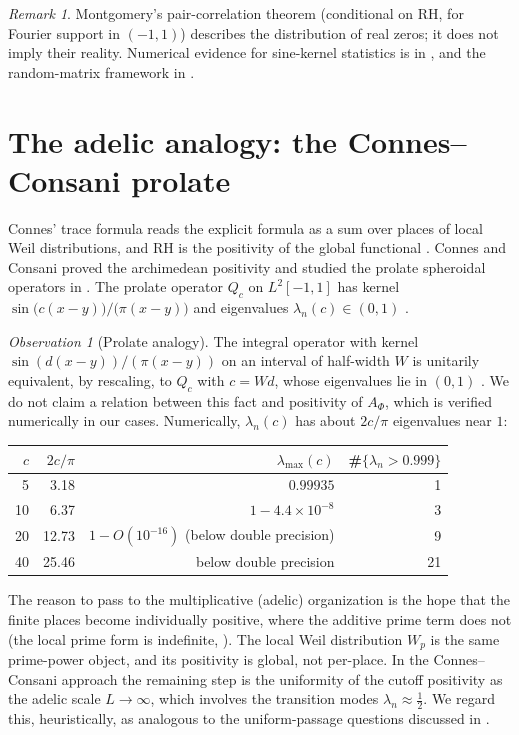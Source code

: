 \documentclass[11pt]{amsart}
\theoremstyle{definition}
\theoremstyle{remark}
\newtheorem{remark}[theorem]{Remark}
\newtheorem{observation}[theorem]{Observation}
\newcommand{\Aphi}{A_\Phi}
\begin{document}
\begin{remark}
Montgomery's pair-correlation theorem \cite{Montgomery} (conditional on RH, for Fourier support in $(-1,1)$)
describes the distribution of real zeros; it does not imply their reality. Numerical evidence for sine-kernel
statistics is in \cite{Odlyzko}, and the random-matrix framework in \cite{RudnickSarnak}.
\end{remark}

\section{The adelic analogy: the Connes--Consani prolate}\label{sec:connes}

Connes' trace formula reads the explicit formula as a sum over places of local Weil distributions, and RH is
the positivity of the global functional \cite{Connes1999}. Connes and Consani proved the archimedean positivity
\cite{CC2021} and studied the prolate spheroidal operators in \cite{CCprolate}. The prolate operator $Q_c$ on
$L^2[-1,1]$ has kernel $\sin\!\big(c(x-y)\big)/\big(\pi(x-y)\big)$ and eigenvalues $\lambda_n(c)\in(0,1)$
\cite{SlepianPollak}.

\begin{observation}[Prolate analogy]\label{obs:prolate}
The integral operator with kernel $\sin(d(x-y))/(\pi(x-y))$ on an interval of half-width $W$ is unitarily
equivalent, by rescaling, to $Q_c$ with $c=Wd$, whose eigenvalues lie in $(0,1)$ \cite{SlepianPollak}. We do not claim a
relation between this fact and positivity of $\Aphi$, which is verified numerically in our cases. Numerically,
$\lambda_n(c)$ has about $2c/\pi$ eigenvalues near $1$:
\begin{center}
\begin{tabular}{rrrr}
\toprule
$c$ & $2c/\pi$ & $\lambda_{\max}(c)$ & \#$\{\lambda_n>0.999\}$\\
\midrule
5 & 3.18 & $0.99935$ & 1\\
10 & 6.37 & $1-4.4\times10^{-8}$ & 3\\
20 & 12.73 & $1-O(10^{-16})$ (below double precision) & 9\\
40 & 25.46 & below double precision & 21\\
\bottomrule
\end{tabular}
\end{center}
\end{observation}

The reason to pass to the multiplicative (adelic) organization is the hope that the finite places become
individually positive, where the additive prime term does not (the local prime form is indefinite,
\cite{Panatomy}). The local Weil distribution $W_p$ is the same prime-power object, and its positivity is
global, not per-place. In the Connes--Consani approach the remaining step is the uniformity of the cutoff
positivity as the adelic scale $L\to\infty$, which involves the transition modes $\lambda_n\approx\tfrac12$.
We regard this, heuristically, as analogous to the uniform-passage questions discussed in
\cite{Pdetector,Pkrein}.
\end{document}

